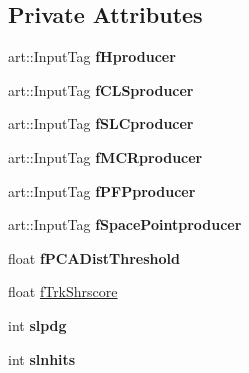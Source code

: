 \subsection*{Private Attributes}
\begin{DoxyCompactItemize}
\item 
art\+::\+Input\+Tag {\bfseries f\+Hproducer}\hypertarget{classanalysis_1_1MCS_ac8beef843afa904c7dfdf1b0c96939d9}{}\label{classanalysis_1_1MCS_ac8beef843afa904c7dfdf1b0c96939d9}

\item 
art\+::\+Input\+Tag {\bfseries f\+C\+L\+Sproducer}\hypertarget{classanalysis_1_1MCS_a190812e7670345f7c5418a3982040343}{}\label{classanalysis_1_1MCS_a190812e7670345f7c5418a3982040343}

\item 
art\+::\+Input\+Tag {\bfseries f\+S\+L\+Cproducer}\hypertarget{classanalysis_1_1MCS_af05e00dad34ccccd3077d878b134011d}{}\label{classanalysis_1_1MCS_af05e00dad34ccccd3077d878b134011d}

\item 
art\+::\+Input\+Tag {\bfseries f\+M\+C\+Rproducer}\hypertarget{classanalysis_1_1MCS_a16be547cea57193ea599bd68b49fd0f7}{}\label{classanalysis_1_1MCS_a16be547cea57193ea599bd68b49fd0f7}

\item 
art\+::\+Input\+Tag {\bfseries f\+P\+F\+Pproducer}\hypertarget{classanalysis_1_1MCS_a6a4980bfa0e96468c380d805e2168f59}{}\label{classanalysis_1_1MCS_a6a4980bfa0e96468c380d805e2168f59}

\item 
art\+::\+Input\+Tag {\bfseries f\+Space\+Pointproducer}\hypertarget{classanalysis_1_1MCS_a94d543319f378d73030122af5426ac12}{}\label{classanalysis_1_1MCS_a94d543319f378d73030122af5426ac12}

\item 
float {\bfseries f\+P\+C\+A\+Dist\+Threshold}\hypertarget{classanalysis_1_1MCS_a4f030a9ba6703a68bdc960827ce0ac72}{}\label{classanalysis_1_1MCS_a4f030a9ba6703a68bdc960827ce0ac72}

\item 
float \hyperlink{classanalysis_1_1MCS_ab1e1092da6852dd280eea3726d0c8195}{f\+Trk\+Shrscore}
\item 
int {\bfseries slpdg}\hypertarget{classanalysis_1_1MCS_a9a33036aa70aea9a2a13e636adfa62d0}{}\label{classanalysis_1_1MCS_a9a33036aa70aea9a2a13e636adfa62d0}

\item 
int {\bfseries slnhits}\hypertarget{classanalysis_1_1MCS_a1608b99744540bda67f686a98513782b}{}\label{classanalysis_1_1MCS_a1608b99744540bda67f686a98513782b}


\end{DoxyCompactItemize}
